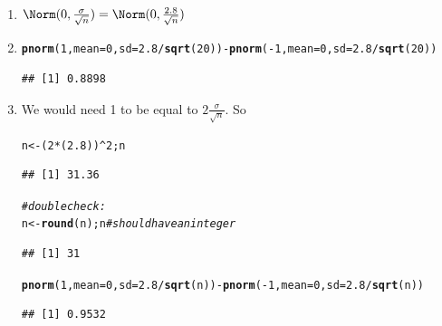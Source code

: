 \documentclass[twoside]{book}\usepackage[]{graphicx}\usepackage[]{xcolor}
\makeatletter
\newcommand{\hlnum}[1]{\textcolor[rgb]{0.686,0.059,0.569}{#1}}%
\newcommand{\hlcom}[1]{\textcolor[rgb]{0.678,0.584,0.686}{\textit{#1}}}%
\newcommand{\hlopt}[1]{\textcolor[rgb]{0,0,0}{#1}}%
\newcommand{\hlstd}[1]{\textcolor[rgb]{0.345,0.345,0.345}{#1}}%
\newcommand{\hlkwb}[1]{\textcolor[rgb]{0.69,0.353,0.396}{#1}}%
\newcommand{\hlkwc}[1]{\textcolor[rgb]{0.333,0.667,0.333}{#1}}%
\newcommand{\hlkwd}[1]{\textcolor[rgb]{0.737,0.353,0.396}{\textbf{#1}}}%
\newenvironment{kframe}{%
 \def\at@end@of@kframe{}%
 \ifinner\ifhmode%
  \def\at@end@of@kframe{\end{minipage}}%
  \begin{minipage}{\columnwidth}%
 \fi\fi%
 \def\FrameCommand##1{\hskip\@totalleftmargin \hskip-\fboxsep
 \colorbox{shadecolor}{##1}\hskip-\fboxsep
     \hskip-\linewidth \hskip-\@totalleftmargin \hskip\columnwidth}%
 \MakeFramed {\advance\hsize-\width
   \@totalleftmargin\z@ \linewidth\hsize
   \@setminipage}}%
 {\par\unskip\endMakeFramed%
 \at@end@of@kframe}
\newenvironment{knitrout}{}{} %
\makeatother
\begin{document}
\begin{solution}
	\begin{enumerate}
		\item
			$\Norm(0, \frac{\sigma}{\sqrt{n}}) = 
			 \Norm(0, \frac{2.8}{\sqrt{n}}) $ 
		 \item
\begin{knitrout}
\color{fgcolor}\begin{kframe}
\begin{alltt}
\hlkwd{pnorm}\hlstd{(}\hlnum{1}\hlstd{,} \hlkwc{mean} \hlstd{=} \hlnum{0}\hlstd{,} \hlkwc{sd} \hlstd{=} \hlnum{2.8}\hlopt{/}\hlkwd{sqrt}\hlstd{(}\hlnum{20}\hlstd{))} \hlopt{-} \hlkwd{pnorm}\hlstd{(}\hlopt{-}\hlnum{1}\hlstd{,} \hlkwc{mean} \hlstd{=} \hlnum{0}\hlstd{,} \hlkwc{sd} \hlstd{=} \hlnum{2.8}\hlopt{/}\hlkwd{sqrt}\hlstd{(}\hlnum{20}\hlstd{))}
\end{alltt}
\begin{verbatim}
## [1] 0.8898
\end{verbatim}
\end{kframe}
\end{knitrout}
		 \item
			 We would need 1 to be equal to $2 \frac{\sigma}{\sqrt n}$. So
\begin{knitrout}
\color{fgcolor}\begin{kframe}
\begin{alltt}
\hlstd{n} \hlkwb{<-} \hlstd{(}\hlnum{2} \hlopt{*} \hlstd{(}\hlnum{2.8}\hlstd{))}\hlopt{^}\hlnum{2}\hlstd{; n}
\end{alltt}
\begin{verbatim}
## [1] 31.36
\end{verbatim}
\begin{alltt}
\hlcom{# double check:}
\hlstd{n} \hlkwb{<-} \hlkwd{round}\hlstd{(n); n}  \hlcom{# should have an integer}
\end{alltt}
\begin{verbatim}
## [1] 31
\end{verbatim}
\begin{alltt}
\hlkwd{pnorm}\hlstd{(}\hlnum{1}\hlstd{,} \hlkwc{mean} \hlstd{=} \hlnum{0}\hlstd{,} \hlkwc{sd} \hlstd{=} \hlnum{2.8}\hlopt{/}\hlkwd{sqrt}\hlstd{(n))} \hlopt{-} \hlkwd{pnorm}\hlstd{(}\hlopt{-}\hlnum{1}\hlstd{,} \hlkwc{mean} \hlstd{=} \hlnum{0}\hlstd{,} \hlkwc{sd} \hlstd{=} \hlnum{2.8}\hlopt{/}\hlkwd{sqrt}\hlstd{(n))}
\end{alltt}
\begin{verbatim}
## [1] 0.9532
\end{verbatim}
\end{kframe}
\end{knitrout}


\end{enumerate}
\end{solution}
\end{document}
